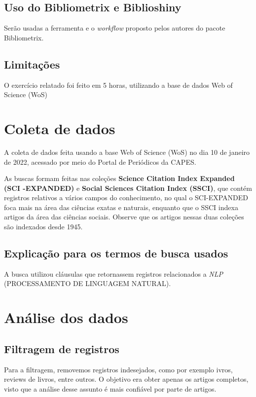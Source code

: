 \subsection{Uso do Bibliometrix e Biblioshiny}
Serão usadas a ferramenta e o \textit{workflow} proposto pelos autores do pacote Bibliometrix.

\subsection{Limitações} O exercício relatado foi feito em 5 horas, utilizando a base de dados Web of Science (WoS)


\section{Coleta de dados\label{MASSA:coleta}}

A coleta de dados feita usando a base Web of Science (WoS) no dia 10 de janeiro de 2022, acessado por meio do Portal de Periódicos da CAPES.

As buscas formam feitas nas coleções \textbf{Science  Citation  Index  Expanded (SCI -EXPANDED)} e \textbf{Social  Sciences  Citation  Index (SSCI)}, que contém registros relativos a vários campos do conhecimento, no qual o SCI-EXPANDED foca mais na área das ciências exatas e naturais, enquanto que o SSCI indexa artigos da área das ciências sociais. Observe que os artigos nessas duas coleções são indexados desde 1945. 


\subsection{Explicação para os termos de busca usados\label{}}

A busca utilizou cláusulas que retornassem registros relacionados a \textit{NLP} (PROCESSAMENTO DE LINGUAGEM NATURAL).

\section{Análise dos dados}

\subsection{Filtragem de registros}

Para a filtragem, removemos registros indesejados, como por exemplo ivros, reviews de livros, entre outros. O objetivo era obter apenas os artigos completos, visto que a análise desse assunto é mais confiável por parte de artigos.

